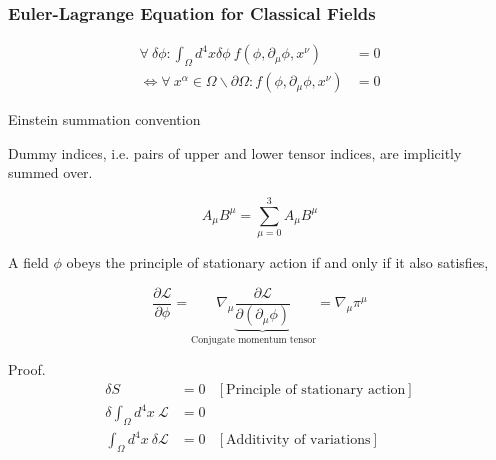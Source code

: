 \documentclass{beamer}
\begin{document}
\begin{frame}
\frametitle{Euler-Lagrange Equation for Classical Fields}

\begin{lemma}

\begin{align*}
\forall \: \delta \phi : \int_{\Omega} d^4 x \delta \phi \: f \left( \phi, \partial_\mu \phi, x^\nu \right) & = 0 \\
\Longleftrightarrow \forall \: x^\alpha \in \Omega \backslash \partial \Omega : f \left( \phi, \partial_\mu \phi, x^\nu \right) & = 0
\end{align*}
\end{lemma}

\begin{block}{Einstein summation convention}

Dummy indices, i.e. pairs of upper and lower tensor indices, are implicitly summed over.
\end{block}

\begin{example}
$$A_\mu B^\mu = \sum_{\mu=0}^3 A_\mu B^\mu$$
\end{example}
\end{frame}

\begin{frame}
\begin{Theorem}
A field $\phi$ obeys the principle of stationary action if and only if it also satisfies,

$$\boxed{\frac{\partial \mathcal{L}}{\partial \phi} = \underset{\text{Conjugate momentum tensor}}{\nabla_\mu \underbrace{\frac{\partial \mathcal{L}}{\partial \left( \partial_\mu \phi \right)}}} = \nabla_\mu \pi^\mu}$$
\end{Theorem}

\begin{block}{Proof.}
\begin{align*}
\delta S & = 0 & \left[ \text{Principle of stationary action} \right] \\
\delta \int_\Omega d^4 x \: \mathcal{L} & = 0 \\
\int_\Omega d^4 x \: \delta \mathcal{L} & = 0 & \left[ \text{Additivity of variations} \right]
\end{align*}
\end{block}
\end{frame}
\end{document}
